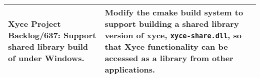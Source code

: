 {\begin{longtable}[h] {>{\raggedright\small}m{2in}|>{\raggedright\let\\\tabularnewline\small}m{3.5in}}
  \textbf{Xyce Project Backlog/637}: Support shared library build of \Xyce{} under Windows.
  &  Modify the cmake build system to support building a shared library version of xyce, \texttt{xyce-share.dll}, so that 
  Xyce functionality can be accessed as a library from other applications.
  \\\hline


\end{longtable}
}
